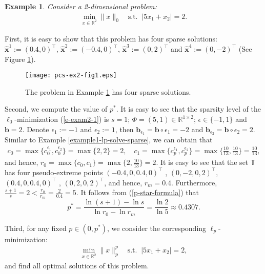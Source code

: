 \documentclass[12pt]{article}
\newtheorem{Example}{Example}[part]
\begin{document}
\begin{Example}\label{example2-lp-solve-sparse}
Consider a 2-dimensional problem:
\begin{eqnarray}\label{e-exam2-1}
\min\limits_{x\in \mathbb{R}^2}\| x \|_0\quad \textrm{s.t.}\;\; |5x_1+x_2|=2.
\end{eqnarray}
\end{Example}

First, it is easy to show that this problem has four sparse solutions: $\hat{\mathbf{x}}^1:=(0.4,0)^\top$, $\hat{\mathbf{x}}^2:=(-0.4,0)^\top$, $\hat{\mathbf{x}}^3:=(0,2)^\top$ and $\hat{\mathbf{x}}^4:=(0,-2)^\top$ (See Figure \ref{examples2-1}).

\begin{figure}[ht]
\centering
\texttt{[image: pcs-ex2-fig1.eps]}
\caption{The problem in Example \ref{example2-lp-solve-sparse} has four sparse solutions.}
\label{examples2-1}
\end{figure}

Second, we compute the value of $p^\ast$. It is easy to see that the sparsity level of the $\ell_0$-minimization (\ref{e-exam2-1}) is $s=1$; $\Phi=(5,1)\in\mathbb{R}^{1\times2}$; $\epsilon\in\{-1,1\}$ and $\mathbf{b}=2$. Denote $\epsilon_1:=-1$ and $\epsilon_2:=1$, then  $\mathbf{b}_{\epsilon_{1}}=\mathbf{b}\circ\epsilon_{1}=-2$ and $\mathbf{b}_{\epsilon_{2}}=\mathbf{b}\circ\epsilon_{2}=2$. Similar to Example \ref{example1-lp-solve-sparse}, we can obtain that
\begin{eqnarray*}
c_0=\max\{c^{\epsilon_1}_0,c^{\epsilon_2}_0\}=\max\{2,2\}=2,\quad
c_1=\max\{c^{\epsilon_1}_p,c^{\epsilon_2}_p\}=\max\{\frac{10}{13},\frac{10}{13}\}=\frac{10}{13},
\end{eqnarray*}
and hence, $r_0=\max\{c_0,c_1\}=\max\{2,\frac{10}{13}\}=2$. It is easy to see that the set $\mathbb{T}$ has four pseudo-extreme points $(-0.4, 0, 0.4, 0)^{\top}$ , $(0,-2, 0, 2)^{\top}$, $(0.4, 0, 0.4, 0)^{\top}$ , $(0, 2, 0, 2)^{\top}$, and hence, $r_m=0.4$. Furthermore, $\frac{s+1}{s}=2<\frac{r_0}{r_m}=\frac{2}{0.4}=5$.
It follows from (\ref{p-star-formula}) that
$$p^\ast=\frac{\ln (s+1)-\ln s}{\ln r_0-\ln r_m }=\frac{\ln 2}{\ln 5}\approx 0.4307.$$

Third, for any fixed $p\in (0,p^\ast)$, we consider the corresponding $\ell_p$-minimization:
\begin{eqnarray}\label{e-exam2-2}
\min\limits_{x\in \mathbb{R}^2}\| x \|_p^p\quad \textrm{s.t.}\;\; |5x_1+x_2|=2,
\end{eqnarray}
and find all optimal solutions of this problem.
\end{document}
